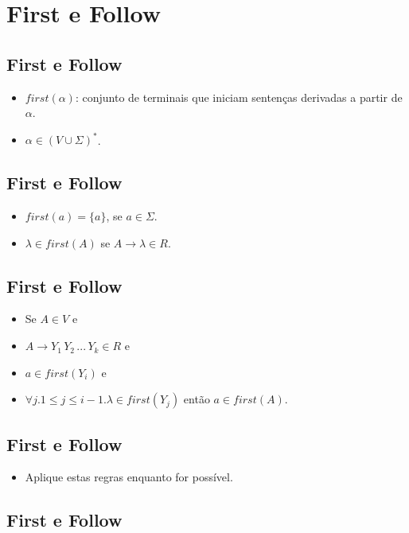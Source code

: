 \documentclass[11pt]{article}
\begin{document}
\section*{First e Follow}
\label{sec:orgea4e52c}

\subsection*{First e Follow}
\label{sec:org66866dc}

\begin{itemize}
\item \(first(\alpha)\): conjunto de terminais que iniciam sentenças derivadas a partir de \(\alpha\).

\item \(\alpha \in (V\cup \Sigma)^*\).
\end{itemize}
\subsection*{First e Follow}
\label{sec:org7660d9c}

\begin{itemize}
\item \(first(a) = \{a\}\), se \(a \in \Sigma\).
\item \(\lambda\in first(A)\) se \(A\to\lambda \in R\).
\end{itemize}
\subsection*{First e Follow}
\label{sec:org351515d}

\begin{itemize}
\item Se \(A \in V\) e
\item \(A \to Y_1\,Y_2\,...\,Y_k \in R\) e
\item \(a\in first(Y_i)\) e
\item \(\forall j. 1 \leq j \leq i - 1. \lambda \in first(Y_j)\) então \(a \in first(A)\).
\end{itemize}
\subsection*{First e Follow}
\label{sec:org726c687}

\begin{itemize}
\item Aplique estas regras enquanto for possível.
\end{itemize}
\subsection*{First e Follow}
\label{sec:orgf079d34}
\end{document}
